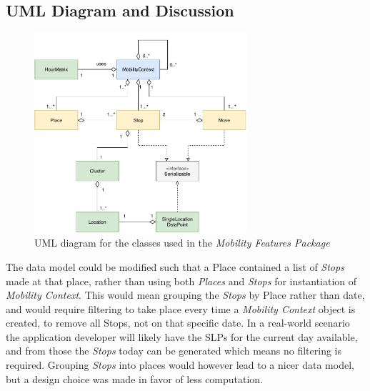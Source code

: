 \subsection{UML Diagram and Discussion}

\begin{figure}[h]
    \centering
    \includegraphics[width=0.7\textwidth]{./images/uml-mobility.pdf}
    \caption{UML diagram for the classes used in the \textit{Mobility Features Package}}
    \label{fig:my_label}
\end{figure}

The data model could be modified such that a Place contained a list of \textit{Stops} made at that place, rather than using both \textit{Places} and \textit{Stops} for instantiation of \textit{Mobility Context}. This would mean grouping the \textit{Stops} by Place rather than date, and would require filtering to take place every time a \textit{Mobility Context} object is created, to remove all Stops, not on that specific date. In a real-world scenario the application developer will likely have the SLPs for the current day available, and from those the \textit{Stops} today can be generated which means no filtering is required. Grouping \textit{Stops} into places would however lead to a nicer data model, but a design choice was made in favor of less computation. 


